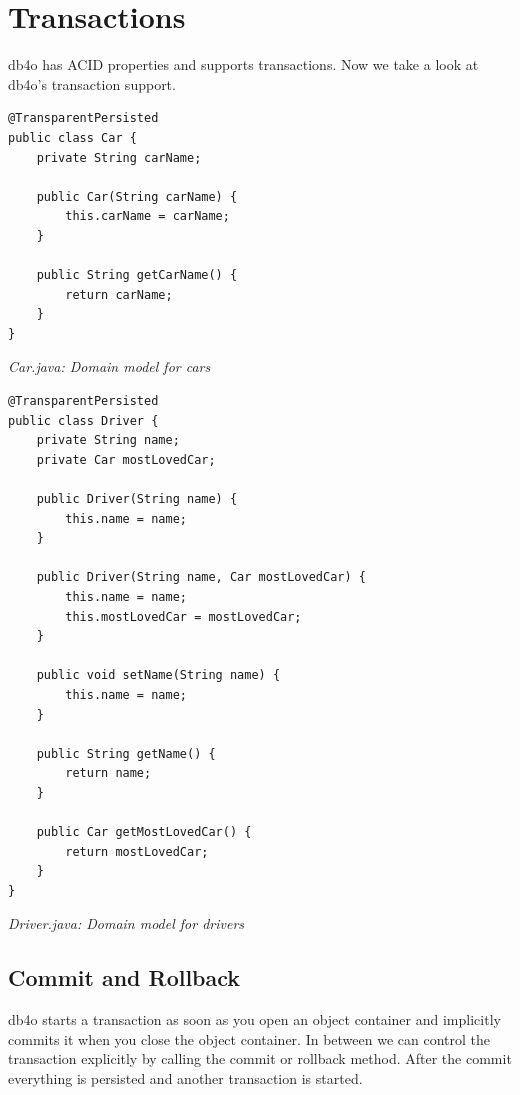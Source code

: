 
\chapter{Transactions}
\label{tut:transactions}

db4o has ACID properties and supports transactions. Now we take a look at db4o's transaction support.

\begin{lstlisting}
@TransparentPersisted
public class Car {
    private String carName;

    public Car(String carName) {
        this.carName = carName;
    }

    public String getCarName() {
        return carName;
    }
}
\end{lstlisting}

{\small\itshape Car.java: Domain model for cars\par}
\medskip

\begin{lstlisting}
@TransparentPersisted
public class Driver {
    private String name;
    private Car mostLovedCar;

    public Driver(String name) {
        this.name = name;
    }

    public Driver(String name, Car mostLovedCar) {
        this.name = name;
        this.mostLovedCar = mostLovedCar;
    }

    public void setName(String name) {
        this.name = name;
    }

    public String getName() {
        return name;
    }

    public Car getMostLovedCar() {
        return mostLovedCar;
    }
}
\end{lstlisting}

{\small\itshape Driver.java: Domain model for drivers\par}
\medskip

\section{Commit and Rollback}
\label{tut:transactions:commitrollback}

db4o starts a transaction as soon as you open an object container and implicitly commits it when you close the object container. In between we can control the transaction explicitly by calling the commit or rollback method. After the commit everything is persisted and another transaction is started.

